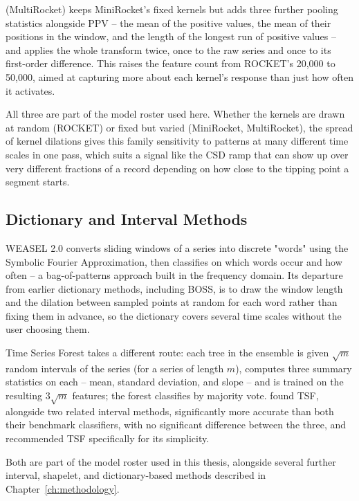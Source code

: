 \citet{tan2022multirocket} (MultiRocket) keeps MiniRocket's fixed kernels but adds three further pooling statistics alongside PPV -- the mean of the positive values, the mean of their positions in the window, and the length of the longest run of positive values -- and applies the whole transform twice, once to the raw series and once to its first-order difference. This raises the feature count from ROCKET's 20{,}000 to 50{,}000, aimed at capturing more about each kernel's response than just how often it activates.

All three are part of the model roster used here. Whether the kernels are drawn at random (ROCKET) or fixed but varied (MiniRocket, MultiRocket), the spread of kernel dilations gives this family sensitivity to patterns at many different time scales in one pass, which suits a signal like the CSD ramp that can show up over very different fractions of a record depending on how close to the tipping point a segment starts.

\subsection{Dictionary and Interval Methods}
WEASEL 2.0 \citep{schafer2023weasel2} converts sliding windows of a series into discrete "words" using the Symbolic Fourier Approximation, then classifies on which words occur and how often -- a bag-of-patterns approach built in the frequency domain. Its departure from earlier dictionary methods, including BOSS, is to draw the window length and the dilation between sampled points at random for each word rather than fixing them in advance, so the dictionary covers several time scales without the user choosing them.

Time Series Forest \citep{deng2013tsf} takes a different route: each tree in the ensemble is given $\sqrt{m}$ random intervals of the series (for a series of length $m$), computes three summary statistics on each -- mean, standard deviation, and slope -- and is trained on the resulting $3\sqrt{m}$ features; the forest classifies by majority vote. \citet{bagnall2017bakeoff} found TSF, alongside two related interval methods, significantly more accurate than both their benchmark classifiers, with no significant difference between the three, and recommended TSF specifically for its simplicity.

Both are part of the model roster used in this thesis, alongside several further interval, shapelet, and dictionary-based methods described in Chapter~\ref{ch:methodology}.

